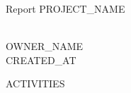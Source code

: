 \documentclass[openany, 10pt]{article}
\begin{document}
    \begin{center}
        \begin{huge}
            Report {{ PROJECT_NAME }}
        \end{huge} \\
        {{ OWNER_NAME }} \\
        {{ CREATED_AT }}
    \end{center}

    \vspace{2cm}

{{ ACTIVITIES }}
\end{document}
